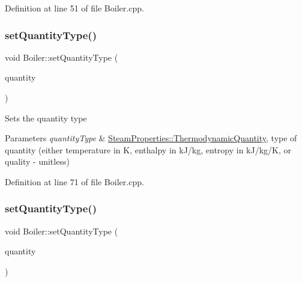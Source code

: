 Definition at line 51 of file Boiler.\+cpp.

\mbox{\label{class_boiler_a9c5b20cae6133c9174b12760f36d52c2}} 
\subsubsection{\texorpdfstring{set\+Quantity\+Type()}{setQuantityType()}\hspace{0.1cm}{\footnotesize\ttfamily [1/3]}}
{\footnotesize\ttfamily void Boiler\+::set\+Quantity\+Type (\begin{DoxyParamCaption}\item[{\hyperlink{class_steam_properties_ae0294bedf7d178c2d8fb6aed0f62fbff}{Steam\+Properties\+::\+Thermodynamic\+Quantity}}]{quantity }\end{DoxyParamCaption})}

Sets the quantity type 
\begin{DoxyParams}{Parameters}
{\em quantity\+Type} & \hyperlink{class_steam_properties_ae0294bedf7d178c2d8fb6aed0f62fbff}{Steam\+Properties\+::\+Thermodynamic\+Quantity}, type of quantity (either temperature in K, enthalpy in k\+J/kg, entropy in k\+J/kg/K, or quality -\/ unitless) \\
\hline
\end{DoxyParams}


Definition at line 71 of file Boiler.\+cpp.

\mbox{\label{class_boiler_a9c5b20cae6133c9174b12760f36d52c2}} 
\subsubsection{\texorpdfstring{set\+Quantity\+Type()}{setQuantityType()}\hspace{0.1cm}{\footnotesize\ttfamily [2/3]}}
{\footnotesize\ttfamily void Boiler\+::set\+Quantity\+Type (\begin{DoxyParamCaption}\item[{\hyperlink{class_steam_properties_ae0294bedf7d178c2d8fb6aed0f62fbff}{Steam\+Properties\+::\+Thermodynamic\+Quantity}}]{quantity }\end{DoxyParamCaption})}

